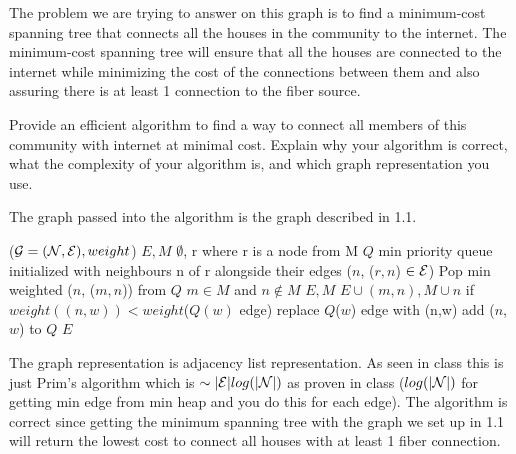 \begin{problem}
\begin{questions}
The problem we are trying to answer on this graph is to find a minimum-cost spanning tree that connects all the houses in the community to the internet. The minimum-cost spanning tree will ensure that all the houses are connected to the internet while minimizing the cost of the connections between them and also assuring there is at least 1 connection to the fiber source.

\item Provide an efficient algorithm to find a way to connect all members of this community with internet at minimal cost. Explain why your algorithm is correct, what the complexity of your algorithm is, and which graph representation you use.

The graph passed into the algorithm is the graph described in 1.1.

\begin{myalgo}{($\mathcal{G} = (\mathcal{N}, \mathcal{E}), weight$)}
  \STATE $E, M$ \GETS $\emptyset$, r where r is a node from M
  \STATE $Q$ \GETS min priority queue initialized with neighbours n of r alongside their edges ($n$, ($r,n$) $\in \mathcal{E}$)
    \STATE Pop min weighted ($n$, ($m,n$)) from $Q$ $m \in M$ and $n \notin M$
    \STATE $E, M$ \GETS $E \cup {(m,n)}, M \cup {n}$
        \STATE if $weight((n,w)) < weight$($Q(w)$ edge) replace $Q$($w$) edge with (n,w)
      \ELSE
        \STATE add ($n$, $w$) to $Q$
      \ENDIF
    \ENDFOR
  \ENDWHILE
  \RETURN $E$
\end{myalgo}

The graph representation is adjacency list representation. As seen in class this is just Prim's algorithm which is $\sim |\mathcal{E}| log(|\mathcal{N}|)$ as proven in class ($log(|\mathcal{N}|)$ for getting min edge from min heap and you do this for each edge).
The algorithm is correct since getting the minimum spanning tree with the graph we set up in 1.1 will return the lowest cost to connect all houses with at least 1 fiber connection.

\end{questions}
\end{problem}

